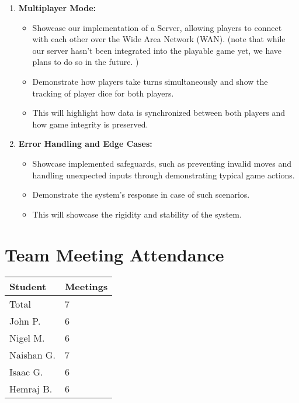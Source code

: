 \documentclass{article}
\begin{document}
\begin{enumerate}
    \item \textbf{Multiplayer Mode:}
    \begin{itemize}
    		\item Showcase our implementation of a Server, allowing players to connect with each other over the Wide Area Network (WAN). (note that while our server hasn't been integrated into the playable game yet, we have plans to do so in the future. ) 
        \item Demonstrate how players take turns simultaneously and show the tracking of player dice for both players.
        \item This will highlight how data is synchronized between both players and how game integrity is preserved.
        
    \end{itemize}
    
    \item \textbf{Error Handling and Edge Cases:}
    \begin{itemize}
        \item Showcase implemented safeguards, such as preventing invalid moves and handling unexpected inputs through demonstrating typical game actions.
        \item Demonstrate the system's response in case of such scenarios.
        \item This will showcase the rigidity and stability of the system.
    \end{itemize}
\end{enumerate}

\newpage
\section{Team Meeting Attendance}


\begin{table}[H]
\centering
\begin{tabular}{ll}
\toprule
\textbf{Student} & \textbf{Meetings}\\
\midrule
Total & 7\\
John P. & 6\\
Nigel M. & 6\\
Naishan G. & 7\\
Isaac G. & 6\\
Hemraj B. & 6\\
\bottomrule
\end{tabular}
\end{table}
\end{document}
